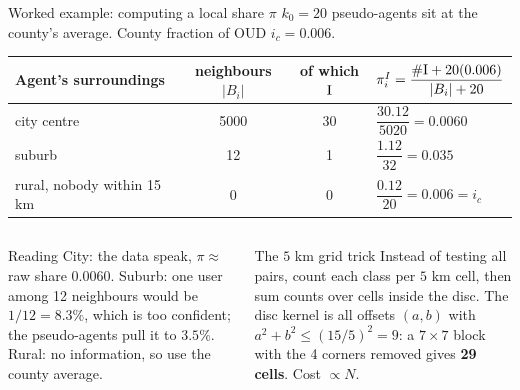 ﻿\documentclass[9pt,aspectratio=169]{beamer}
\begin{document}
\begin{frame}{Worked example: computing a local share $\pi$}
 $k_0=20$ pseudo-agents sit at the county's average. County fraction of OUD $i_c=0.006$.
 \par\smallskip
 \small\renewcommand{\arraystretch}{1.2}
 \begin{tabular}{@{}l c c l@{}}
 \toprule Agent's surroundings & neighbours $|B_i|$ & of which $\mathrm{I}$ & $\pi^I_i=\dfrac{\#\mathrm{I}+20(0.006)}{|B_i|+20}$\\\midrule
 city centre & 5000 & 30 & $\dfrac{30.12}{5020}=0.0060$\\[6pt]
 suburb & 12 & 1 & $\dfrac{1.12}{32}=0.035$\\[6pt]
 rural, nobody within 15 km & 0 & 0 & $\dfrac{0.12}{20}=0.006=i_c$\\\bottomrule
 \end{tabular}
 \par\smallskip
 \begin{columns}[T]
 \begin{block}{Reading}\small
  City: the data speak, $\pi\approx$ raw share $0.0060$. Suburb: one user among 12 neighbours would be $1/12=8.3\%$, which is too confident; the pseudo-agents pull it to $3.5\%$. Rural: no information, so use the county average.
 \end{block}
 \begin{block}{The $5$ km grid trick}\small
  Instead of testing all pairs, count each class per $5$ km cell, then sum counts over cells inside the disc. The disc kernel is all offsets $(a,b)$ with $a^2+b^2\le(15/5)^2=9$: a $7\times7$ block with the 4 corners removed gives \textbf{29 cells}. Cost $\propto N$.
 \end{block}
 \end{columns}
\end{frame}
\end{document}

